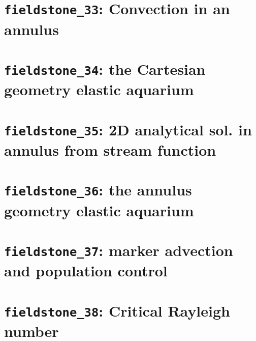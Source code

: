 \documentclass[a4paper]{article}
\begin{document}
\newpage %
\section{{\tt fieldstone\_33}: Convection in an annulus \label{f33}} %

\newpage %
\section{{\tt fieldstone\_34}: the Cartesian geometry elastic aquarium \label{f34}} %

\newpage %
\section{{\tt fieldstone\_35}: 2D analytical sol. in annulus from stream function \label{f35}}

\newpage %
\section{{\tt fieldstone\_36}: the annulus geometry elastic aquarium \label{f36}}%

\newpage %
\section{{\tt fieldstone\_37}: marker advection and population control \label{f37}} %

\newpage %
\section{{\tt fieldstone\_38}: Critical Rayleigh number \label{f38}} %
\end{document}
